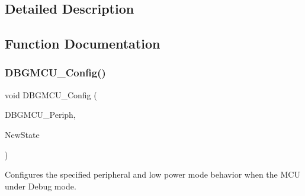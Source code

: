 \subsection{Detailed Description}


\subsection{Function Documentation}
\mbox{\label{group___d_b_g_m_c_u___private___functions_gadf2f267f855ac1e4c03905c5dcfbd28b}} 
\subsubsection{\texorpdfstring{D\+B\+G\+M\+C\+U\+\_\+\+Config()}{DBGMCU\_Config()}}
{\footnotesize\ttfamily void D\+B\+G\+M\+C\+U\+\_\+\+Config (\begin{DoxyParamCaption}\item[{uint32\+\_\+t}]{D\+B\+G\+M\+C\+U\+\_\+\+Periph,  }\item[{\hyperlink{group___exported__types_gac9a7e9a35d2513ec15c3b537aaa4fba1}{Functional\+State}}]{New\+State }\end{DoxyParamCaption})}



Configures the specified peripheral and low power mode behavior when the M\+CU under Debug mode. 


